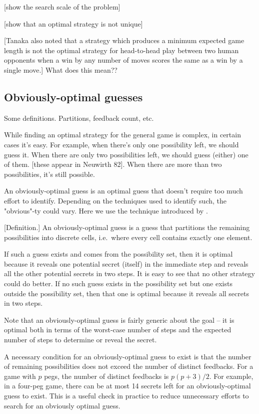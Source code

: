 [show the search scale of the problem]

[show that an optimal strategy is not unique]

[Tanaka also noted that a strategy which produces a minimum expected
game length is not the optimal strategy for head-to-head play between two human
opponents when a win by any number of moves scores the same as a win by a
single move.] What does this mean??


\subsection{Obviously-optimal guesses}

Some definitions. Partitions, feedback count, etc.



While finding an optimal strategy for the general game is complex, in certain cases it's easy. For example, when there's only one possibility left, we should guess it. When there are only two possibilities left, we should guess (either) one of them. [these appear in Neuwirth 82]. When there are more than two possibilities, it's still possible.

An obviously-optimal guess is an optimal guess that doesn't require too much effort to identify. Depending on the techniques used to identify such, the "obvious"-ty could vary. Here we use the technique introduced by \cite{koyama93}. 

[Definition.] An obviously-optimal guess is a guess that partitions the remaining possibilities into discrete cells, i.e.\ where every cell contains exactly one element. 

If such a guess exists and comes from the possibility set, then it is optimal because it reveals one potential secret (itself) in the immediate step and reveals all the other potential secrets in two steps. It is easy to see that no other strategy could do better. If no such guess exists in the possibility set but one exists outside the possibility set, then that one is optimal because it reveals all secrets in two steps. 

Note that an obviously-optimal guess is fairly generic about the goal -- it is optimal both in terms of the worst-case number of steps and the expected number of steps to determine or reveal the secret.

A necessary condition for an obviously-optimal guess to exist is that the number of remaining possibilities does not exceed the number of distinct feedbacks. For a game with $p$ pegs, the number of distinct feedbacks is $p(p+3)/2$. For example, in a four-peg game, there can be at most 14 secrets left for an obviously-optimal guess to exist. This is a useful check in practice to reduce unnecessary efforts to search for an obviously optimal guess.

